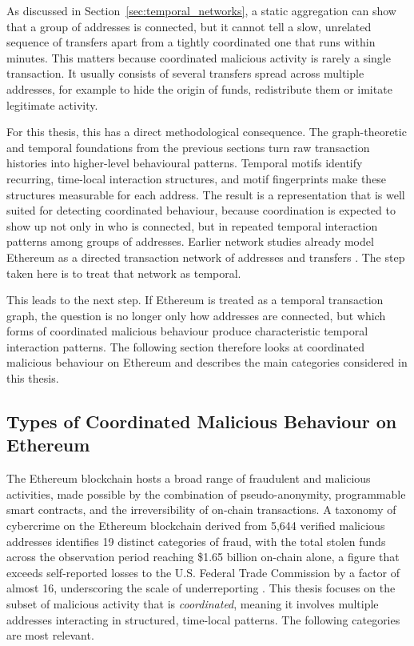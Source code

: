 \documentclass{thesisclass}
\begin{document}
As discussed in Section~\ref{sec:temporal_networks}, a static aggregation can show that a group of addresses is connected, but it cannot tell a slow, unrelated sequence of transfers apart from a tightly coordinated one that runs within minutes. This matters because coordinated malicious activity is rarely a single transaction. It usually consists of several transfers spread across multiple addresses, for example to hide the origin of funds, redistribute them or imitate legitimate activity.

For this thesis, this has a direct methodological consequence. The graph-theoretic and temporal foundations from the previous sections turn raw transaction histories into higher-level behavioural patterns. Temporal motifs identify recurring, time-local interaction structures, and motif fingerprints make these structures measurable for each address. The result is a representation that is well suited for detecting coordinated behaviour, because coordination is expected to show up not only in who is connected, but in repeated temporal interaction patterns among groups of addresses. Earlier network studies already model Ethereum as a directed transaction network of addresses and transfers \cite{wu2020temporal}. The step taken here is to treat that network as temporal.

This leads to the next step. If Ethereum is treated as a temporal transaction graph, the question is no longer only how addresses are connected, but which forms of coordinated malicious behaviour produce characteristic temporal interaction patterns. The following section therefore looks at coordinated malicious behaviour on Ethereum and describes the main categories considered in this thesis.

\subsection{Types of Coordinated Malicious Behaviour on Ethereum}
\label{sec:scam_types}
The Ethereum blockchain hosts a broad range of fraudulent and malicious activities, made possible by the combination of pseudo-anonymity, programmable smart contracts, and the irreversibility of on-chain transactions. A taxonomy of cybercrime on the Ethereum blockchain derived from 5,644 verified malicious addresses identifies 19 distinct categories of fraud, with the total stolen funds across the observation period reaching \$1.65 billion on-chain alone, a figure that exceeds self-reported losses to the U.S. Federal Trade Commission by a factor of almost 16, underscoring the scale of underreporting \citep{hornuf2025cybercrime}. This thesis focuses on the subset of malicious activity that is \emph{coordinated}, meaning it involves multiple addresses interacting in structured, time-local patterns. The following categories are most relevant.
\end{document}
